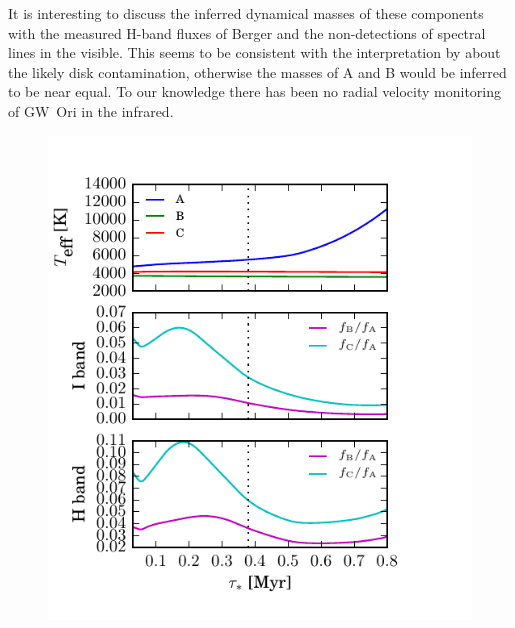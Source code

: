 \documentclass[twocolumn]{aastex6}
\begin{document}
It is interesting to discuss the inferred dynamical masses of these components with the measured H-band fluxes of Berger and the non-detections of spectral lines in the visible. This seems to be consistent with the interpretation by \citet{berger11} about the likely disk contamination, otherwise the masses of A and B would be inferred to be near equal. To our knowledge there has been no radial velocity monitoring of GW~Ori in the infrared.

\begin{figure}[htb]
\begin{center}
  \includegraphics{evolution.pdf}
  \end{center}
\end{figure}
\end{document}
